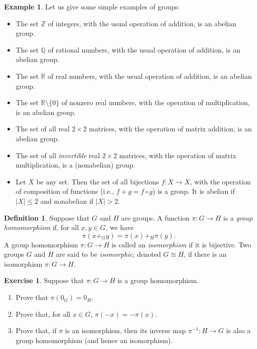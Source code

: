 \documentclass[a4paper]{memoir}
\theoremstyle{definition}
\newtheorem{definition}[theorem]{Definition}
\newtheorem{exercise}[theorem]{Exercise}
\newtheorem{example}[theorem]{Example}
\newcommand{\bb}{\mathbb}
\newcommand{\ra}{\rightarrow}
\begin{document}
\begin{example}
  Let us give some simple examples of groups:
  \begin{itemize}
    \item The set $\bb{Z}$ of integers, with the usual operation of addition, is an abelian group.
    \item The set $\bb{Q}$ of rational numbers, with the usual operation of addition, is an 
    abelian group.
    \item The set $\bb{R}$ of real numbers, with the usual operation of addition, is an abelian group.
    \item The set $\bb{R} \setminus \{0\}$ of nonzero real numbers, with the operation of 
    multiplication, is an abelian group.
    \item The set of all real $2 \times 2$ matrices, with the operation of matrix addition, is 
    an abelian group.
    \item The set of all \emph{invertible} real $2 \times 2$ matrices, with the operation of 
    matrix multiplication, is a (nonabelian) group.
    \item Let $X$ be any set. Then the set of all bijections $f : X \ra X$, with the operation of 
    composition of functions (i.e., $f + g = f \circ g$) is a group. It is abelian if $|X| \leq 2$ 
    and nonabelian if $|X| > 2$.
  \end{itemize}
\end{example}

\begin{definition}
  Suppose that $G$ and $H$ are groups. A function $\pi : G \ra H$ is a \emph{group homomorphism} 
  if, for all $x,y \in G$, we have
  \[
    \pi(x +_G y) = \pi(x) +_H \pi(y).
  \]
  A group homomorphism $\pi : G \ra H$ is called an \emph{isomorphism} if it is bijective. 
  Two groups $G$ and $H$ are said to be \emph{isomorphic}, denoted 
  $G \cong H$, if there is an isomorphism $\pi : G \ra H$.
\end{definition}

\begin{exercise}
  Suppose that $\pi : G \ra H$ is a group homomorphism.
  \begin{enumerate}
    \item Prove that $\pi(0_G) = 0_H$.
    \item Prove that, for all $x \in G$, $\pi(-x) = -\pi(x)$.
    \item Prove that, if $\pi$ is an isomorphism, then its inverse map 
    $\pi^{-1} : H \ra G$ is also a group homomorphism (and hence an isomorphism).
  \end{enumerate}
\end{exercise}
\end{document}
